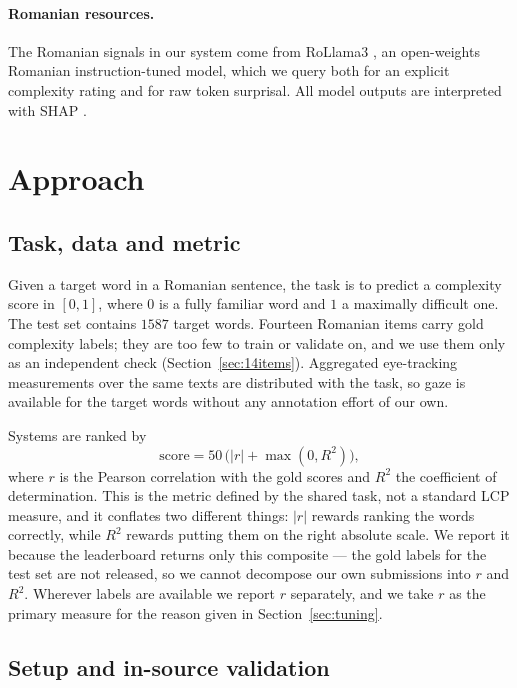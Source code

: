 \documentclass[11pt]{article}
\begin{document}
\paragraph{Romanian resources.}
The Romanian signals in our system come from RoLlama3
\citep{masala-etal-2024-vorbesti}, an open-weights Romanian
instruction-tuned model, which we query both for an explicit
complexity rating and for raw token surprisal. All model outputs are
interpreted with SHAP \citep{lundberg2017shap}.

\section{Approach}
\label{section:approach}

\subsection{Task, data and metric}

Given a target word in a Romanian sentence, the task is to predict a
complexity score in $[0,1]$, where $0$ is a fully familiar word and $1$
a maximally difficult one. The test set contains $1587$ target words.
Fourteen Romanian items carry gold complexity labels; they are too few
to train or validate on, and we use them only as an independent check
(Section~\ref{sec:14items}). Aggregated eye-tracking measurements over
the same texts are distributed with the task, so gaze is available for
the target words without any annotation effort of our own.

Systems are ranked by
\begin{equation}
  \label{eq:metric}
  \mathrm{score} = 50\,\bigl(|r| + \max(0, R^2)\bigr),
\end{equation}
where $r$ is the Pearson correlation with the gold scores and $R^2$ the
coefficient of determination. This is the metric defined by the shared
task, not a standard LCP measure, and it conflates two different
things: $|r|$ rewards ranking the words correctly, while $R^2$ rewards
putting them on the right absolute scale. We report it because the
leaderboard returns only this composite --- the gold labels for the
test set are not released, so we cannot decompose our own submissions
into $r$ and $R^2$. Wherever labels are available we report $r$
separately, and we take $r$ as the primary measure for the reason given
in Section~\ref{sec:tuning}.

\subsection{Setup and in-source validation}
\end{document}
